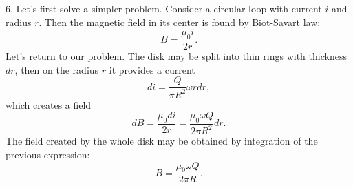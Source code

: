\documentclass[12pt,a4paper,pdflatex]{disser}
\begin{document}
6. Let's first solve a simpler problem. Consider a circular loop with current $i$ and radius $r$. Then the magnetic field in its center is found by Biot-Savart law:
$$
  B=\frac{\mu_0 i}{2r}.
$$
Let's return to our problem. The disk may be split into thin rings with thickness $dr$, then on the radius $r$ it provides a current
$$
  di=\frac{Q}{\pi R^2}\omega rdr,
$$
which creates a field
$$
  dB=\frac{\mu_0 di}{2r}=\frac{\mu_0 \omega Q}{2\pi R^2}dr.
$$
The field created by the whole disk may be obtained by integration of the previous expression:
$$
  B=\frac{\mu_0 \omega Q}{2\pi R}.
$$
\end{document}
